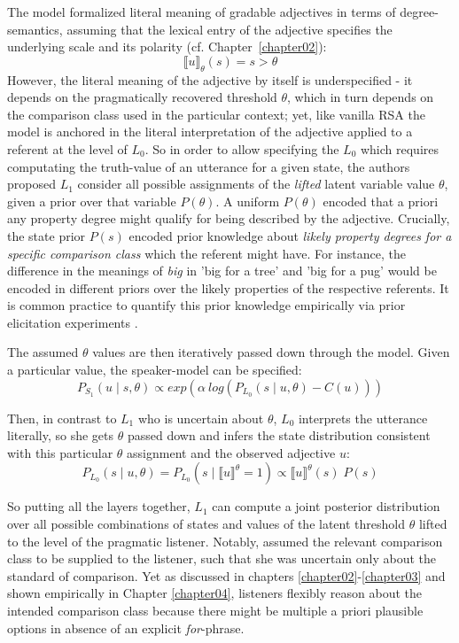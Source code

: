 The model formalized literal meaning of gradable adjectives in terms of degree-semantics, assuming that the lexical entry of the adjective specifies the underlying scale and its polarity (cf. Chapter~\ref{chapter02}):
\begin{equation}
\llbracket u \rrbracket_{\theta} (s) = s > \theta
\end{equation}
However, the literal meaning of the adjective by itself is underspecified - it depends on the pragmatically recovered threshold $\theta$, which in turn depends on the comparison class used in the particular context; yet, like vanilla RSA the model is anchored in the literal interpretation of the adjective applied to a referent at the level of $L_0$.  
So in order to allow specifying the $L_0$ which requires computating the truth-value of an utterance for a given state, the authors proposed $L_1$ consider all possible assignments of the \emph{lifted} latent variable value $\theta$, given a prior over that variable $P(\theta)$. A uniform $P(\theta)$ encoded that a priori any property degree might qualify for being described by the adjective. Crucially, the state prior $P(s)$ encoded prior knowledge about \emph{likely property degrees for a specific comparison class} which the referent might have. For instance, the difference in the meanings of \emph{big} in 'big for a tree' and 'big for a pug' would be encoded in different priors over the likely properties of the respective referents. It is common practice to quantify this prior knowledge empirically via prior elicitation experiments \parencite{problang}.

The assumed $\theta$ values are then iteratively passed down through the model. Given a particular value, the speaker-model can be specified:
\begin{equation}
	P_{S_1} (u \mid s, \theta) \propto exp(\alpha \: log (P_{L_0} (s \mid u, \theta) - C(u)) )
\end{equation}	

Then, in contrast to $L_1$ who is uncertain about $\theta$, $L_0$ interprets the utterance literally, so she gets $\theta$ passed down and infers the state distribution consistent with this particular $\theta$ assignment and the observed adjective $u$:
\begin{equation}
P_{L_0} (s \mid u, \theta) = P_{L_0} (s \mid \llbracket u \rrbracket ^\theta = 1 ) \propto \llbracket u \rrbracket ^\theta (s) \; P(s)
\end{equation}

So putting all the layers together, $L_1$ can compute a joint posterior distribution over all possible combinations of states and values of the latent threshold $\theta$ lifted to the level of the pragmatic listener. Notably, \textcite{lassiter2013context} assumed the relevant comparison class to be supplied to the listener, such that she was uncertain only about the standard of comparison. Yet as discussed in chapters \ref{chapter02}-\ref{chapter03} and shown empirically in Chapter \ref{chapter04}, listeners flexibly reason about the intended comparison class because there might be multiple a priori plausible options in absence of an explicit \emph{for}-phrase.

